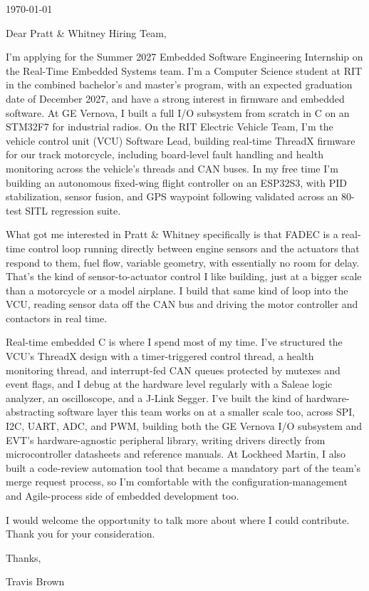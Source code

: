 \documentclass[11pt]{article}
\begin{document}
\begin{flushright}
  \today
\end{flushright}

Dear Pratt \& Whitney Hiring Team,

I'm applying for the Summer 2027 Embedded Software Engineering Internship
on the Real-Time Embedded Systems team. I'm a Computer Science student at
RIT in the combined bachelor's
and master's program, with an expected graduation date of December 2027,
and have a strong interest in firmware and embedded software. At GE
Vernova, I built a full I/O subsystem from scratch in C on an STM32F7 for
industrial radios. On the RIT Electric Vehicle Team, I'm the vehicle
control unit (VCU) Software Lead, building real-time ThreadX firmware for
our track motorcycle, including board-level fault handling and health
monitoring across the vehicle's threads and CAN buses. In my free time I'm
building an autonomous fixed-wing flight controller on an ESP32S3, with PID
stabilization, sensor fusion, and GPS waypoint following validated across
an 80-test SITL regression suite.

What got me interested in Pratt \& Whitney specifically is that FADEC is a
real-time control loop running directly between engine sensors and the
actuators that respond to them, fuel flow, variable geometry, with
essentially no room for delay. That's the kind of sensor-to-actuator
control I like building, just at a bigger scale than a motorcycle or a
model airplane. I build that same kind of loop into the VCU, reading
sensor data off the CAN bus and driving the motor controller and
contactors in real time.

Real-time embedded C is where I spend most of my time. I've structured the
VCU's ThreadX design with a timer-triggered control thread, a health
monitoring thread, and interrupt-fed CAN queues protected by mutexes and
event flags, and I debug at the hardware level regularly with a Saleae
logic analyzer, an oscilloscope, and a J-Link Segger. I've built the kind
of hardware-abstracting software layer this team works on at a smaller
scale too, across SPI, I2C, UART, ADC, and PWM,
building both the GE Vernova I/O subsystem and EVT's hardware-agnostic
peripheral library, writing drivers directly from microcontroller
datasheets and reference manuals. At Lockheed Martin, I
also built a code-review automation tool that became a mandatory part of
the team's merge request process, so I'm comfortable with the
configuration-management and Agile-process side of embedded development
too.

I would welcome the opportunity to talk more about where I could
contribute. Thank you for your consideration.

Thanks,

Travis Brown
\end{document}
